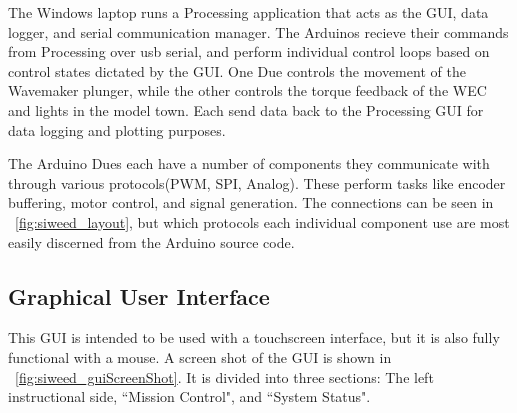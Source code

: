 \documentclass[11pt, letterpaper]{article}
\begin{document}
The Windows laptop runs a Processing application that acts as the GUI, data logger, and serial communication manager.
The Arduinos recieve their commands from Processing over usb serial, and perform individual control loops based on control states dictated by the GUI.
One Due controls the movement of the Wavemaker plunger, while the other controls the torque feedback of the WEC and lights in the model town.
Each send data back to the Processing GUI for data logging and plotting purposes.

The Arduino Dues each have a number of components they communicate with through various protocols(PWM, SPI, Analog).
These perform tasks like encoder buffering, motor control, and signal generation.
The connections can be seen in \figurename~\ref{fig:siweed_layout}, but which protocols each individual component use are most easily discerned from the Arduino source code.

\subsection{Graphical User Interface}
This GUI is intended to be used with a touchscreen interface, but it is also fully functional with a mouse.
A screen shot of the GUI is shown in \figurename~\ref{fig:siweed_guiScreenShot}.
It is divided into three sections: The left instructional side, ``Mission Control", and ``System Status".
\end{document}
